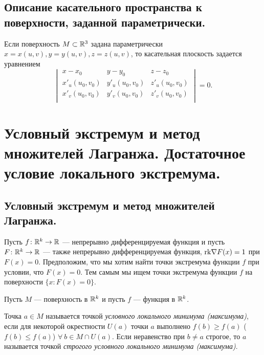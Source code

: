 \documentclass[a4paper]{article}
\theoremstyle{named}
\begin{document}
    \subsection{Описание касательного пространства к поверхности, заданной параметрически.}

    Если поверхность $M \subset \mathbb{R}^3$ задана параметрически $x = x(u, v), y = y(u, v), z = z(u, v)$, то касательная плоскость задается уравнением
    \begin{equation*}
        \begin{vmatrix}
            x - x_0 & y - y_0 & z - z_0 \\
            x'_u(u_0, v_0) & y'_u(u_0, v_0) & z'_u(u_0, v_0) \\
            x'_v(u_0, v_0) & y'_v(u_0, v_0) & z'_v(u_0, v_0) \\
        \end{vmatrix}
        = 0.
    \end{equation*}

    \section{Условный экстремум и метод множителей Лагранжа. Достаточное условие локального экстремума.}

    \subsection{Условный экстремум и метод множителей Лагранжа.}

    Пусть $f\colon \mathbb{R}^k\to \mathbb{R}$ --- непрерывно дифференцируемая функция и пусть $F\colon \mathbb{R}^k\to \mathbb{R}$ --- также непрерывно дифференцируемая функция,
    ${\rm rk}\nabla F(x)=1$ при $F(x)=0$.
    Предположим, что мы хотим найти точки экстремума функции $f$ при условии, что $F(x)=0$. Тем самым мы ищем точки экстремума функции $f$ на поверхности $\{x\colon F(x)=0\}$.
    
    \begin{definition*}
        Пусть $M$ --- поверхность в $\mathbb{R}^k$	и пусть $f$ --- функция в $\mathbb{R}^k$. 
    
        Точка $a\in M$ называется точкой {\it условного локального минимума (максимума)}, если для некоторой окрестности $U(a)$ точки $a$
        выполнено $f(b)\ge f(a)$ ($f(b)\leq f(a)$) $\forall\ b\in M\cap U(a)$. Если неравенство при $b\ne a$ строгое, то $a$ называется точкой {\it строгого условного локального минимума (максимума)}.
    \end{definition*}
    
\end{document}
